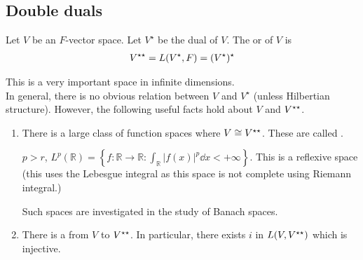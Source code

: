 \subsection{Double duals}
\begin{definition}
	Let $V$ be an $F$-vector space.
	Let $V^\star$ be the dual of $V$.
	The  or  of $V$ is
	\begin{align*}
		V^{\star\star} = L(V^\star, F) = (V^\star)^\star
	\end{align*}
\end{definition}
\begin{remark}
	This is a very important space in infinite dimensions. \\
	In general, there is no obvious relation between $V$ and $V^\star$ (unless Hilbertian structure).
	However, the following useful facts hold about $V$ and $V^{\star\star}$.
	\begin{enumerate}
		\item There is a large class of function spaces where $V \cong V^{\star\star}$.
		These are called .
		\begin{example}
			$p > r$, $L^p(\mathbb{R}) = \left\{ f : \mathbb{R} \to \mathbb{R} : \int_{\mathbb{R}} |f(x)|^p \dd{x} < + \infty \right\}$.
			This is a reflexive space (this uses the Lebesgue integral as this space is not complete using Riemann integral.)
		\end{example} 
		Such spaces are investigated in the study of Banach spaces.
		\item There is a  from $V$ to $V^{\star\star}$.
		In particular, there exists $i$ in $L(V, V^{\star\star})$ which is injective.
	\end{enumerate}
\end{remark}

